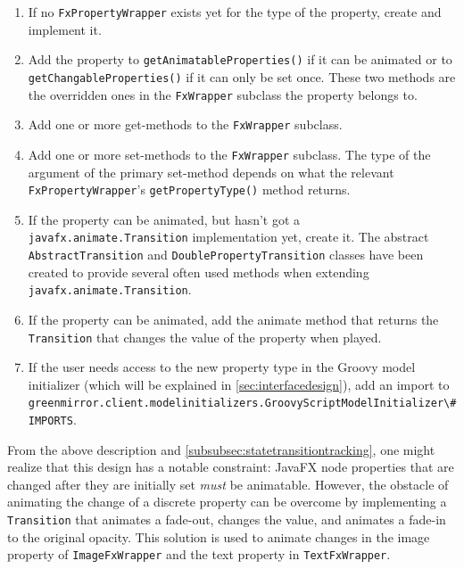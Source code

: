 \documentclass[a4paper]{article}
\begin{document}
	\begin{enumerate}
		\item If no \lstinline{FxPropertyWrapper} exists yet for the type of the property, create and implement it.
		\item Add the property to \lstinline{getAnimatableProperties()} if it can be animated or to \lstinline{getChangableProperties()} if it can only be set once. These two methods are the overridden ones in the \lstinline{FxWrapper} subclass the property belongs to.
		\item Add one or more get-methods to the \lstinline{FxWrapper} subclass.
		\item Add one or more set-methods to the \lstinline{FxWrapper} subclass. The type of the argument of the primary set-method depends on what the relevant \lstinline{FxPropertyWrapper}'s \lstinline{getPropertyType()} method returns.
		\item If the property can be animated, but hasn't got a \lstinline{javafx.animate.Transition} implementation yet, create it. The abstract \lstinline{AbstractTransition} and \lstinline{DoublePropertyTransition} classes have been created to provide several often used methods when extending \lstinline{javafx.animate.Transition}.
		\item If the property can be animated, add the animate method that returns the \lstinline{Transition} that changes the value of the property when played.
		\item If the user needs access to the new property type in the Groovy model initializer (which will be explained in \cref{sec:interfacedesign}), add an import to\\ \lstinline{greenmirror.client.modelinitializers.GroovyScriptModelInitializer\#IMPORTS}.
	\end{enumerate}
	
	From the above description and \cref{subsubsec:statetransitiontracking}, one might realize that this design has a notable constraint: JavaFX node properties that are changed after they are initially set \emph{must} be animatable. However, the obstacle of animating the change of a discrete property can be overcome by implementing  a \lstinline{Transition} that animates a fade-out, changes the value, and animates a fade-in to the original opacity. This solution is used to animate changes in the image property of \lstinline{ImageFxWrapper} and the text property in \lstinline{TextFxWrapper}.
	
	
	
\end{document}
